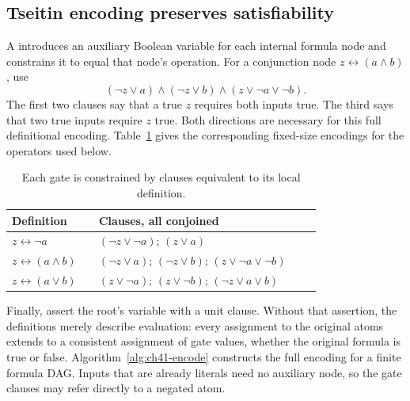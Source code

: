 \subsection{Tseitin encoding preserves satisfiability}
\label{sec:ch41-tseitin}

A  introduces an auxiliary Boolean variable for each internal formula node and constrains it to equal that node's operation.
For a conjunction node $z\leftrightarrow(a\land b)$, use
\[
 (\neg z\lor a)\land(\neg z\lor b)\land
 (z\lor\neg a\lor\neg b).
\]
The first two clauses say that a true $z$ requires both inputs true.
The third says that two true inputs require $z$ true.
Both directions are necessary for this full definitional encoding.
Table~\ref{tab:ch41-gate-clauses} gives the corresponding fixed-size encodings for the operators used below.

\begin{table}
\caption{Each gate is constrained by clauses equivalent to its local definition.}
\label{tab:ch41-gate-clauses}
\centering
\begin{tabular}{p{0.25\linewidth}p{0.64\linewidth}}
\toprule
Definition & Clauses, all conjoined \\
\midrule
$z\leftrightarrow\neg a$ & $(\neg z\lor\neg a)$; $(z\lor a)$ \\
$z\leftrightarrow(a\land b)$ & $(\neg z\lor a)$; $(\neg z\lor b)$; $(z\lor\neg a\lor\neg b)$ \\
$z\leftrightarrow(a\lor b)$ & $(z\lor\neg a)$; $(z\lor\neg b)$; $(\neg z\lor a\lor b)$ \\
\bottomrule
\end{tabular}
\end{table}

Finally, assert the root's variable with a unit clause.
Without that assertion, the definitions merely describe evaluation: every assignment to the original atoms extends to a consistent assignment of gate values, whether the original formula is true or false.
Algorithm~\ref{alg:ch41-encode} constructs the full encoding for a finite formula DAG.
Inputs that are already literals need no auxiliary node, so the gate clauses may refer directly to a negated atom.

